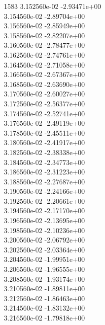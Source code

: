 1583	3.152560e-02	-2.93471e+00	\\ 	3.154560e-02	-2.89704e+00	\\ 	3.156560e-02	-2.85949e+00	\\ 	3.158560e-02	-2.82207e+00	\\ 	3.160560e-02	-2.78477e+00	\\ 	3.162560e-02	-2.74761e+00	\\ 	3.164560e-02	-2.71058e+00	\\ 	3.166560e-02	-2.67367e+00	\\ 	3.168560e-02	-2.63690e+00	\\ 	3.170560e-02	-2.60027e+00	\\ 	3.172560e-02	-2.56377e+00	\\ 	3.174560e-02	-2.52741e+00	\\ 	3.176560e-02	-2.49119e+00	\\ 	3.178560e-02	-2.45511e+00	\\ 	3.180560e-02	-2.41917e+00	\\ 	3.182560e-02	-2.38338e+00	\\ 	3.184560e-02	-2.34773e+00	\\ 	3.186560e-02	-2.31223e+00	\\ 	3.188560e-02	-2.27687e+00	\\ 	3.190560e-02	-2.24166e+00	\\ 	3.192560e-02	-2.20661e+00	\\ 	3.194560e-02	-2.17170e+00	\\ 	3.196560e-02	-2.13695e+00	\\ 	3.198560e-02	-2.10236e+00	\\ 	3.200560e-02	-2.06792e+00	\\ 	3.202560e-02	-2.03364e+00	\\ 	3.204560e-02	-1.99951e+00	\\ 	3.206560e-02	-1.96555e+00	\\ 	3.208560e-02	-1.93174e+00	\\ 	3.210560e-02	-1.89811e+00	\\ 	3.212560e-02	-1.86463e+00	\\ 	3.214560e-02	-1.83132e+00	\\ 	3.216560e-02	-1.79818e+00	\\ \hline
